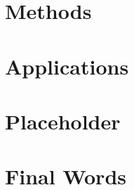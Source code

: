 \documentclass[]{book}
\begin{document}
\chapter{Methods}\label{methods}

\chapter{Applications}\label{applications}

\chapter{Placeholder}\label{placeholder}

\chapter{Final Words}\label{final-words}


\end{document}

